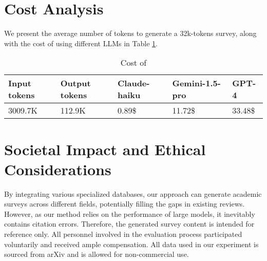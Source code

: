 \section{Cost Analysis}
We present the average number of tokens to generate a 32k-tokens survey, along with the cost of using different LLMs in Table \ref{table:price}. 

\begin{table}[h!]
    \centering
    \caption{Cost of \ourmethod}
    \begin{tabular}{lllll} 
        \toprule
        \textbf{Input tokens} & \textbf{Output tokens}& \textbf{Claude-haiku}&\textbf{Gemini-1.5-pro} & \textbf{GPT-4}\\ 
        \midrule
         3009.7K&112.9K &  0.89\$&11.72\$&33.48\$\\
        \bottomrule
    \end{tabular}
    \label{table:price}
\end{table}

\label{appendix:computational analysis}
\section{Societal Impact and Ethical 
Considerations}
\label{appendix:societal_impact}
By integrating various specialized databases, our approach can generate academic surveys across different fields, potentially filling the gaps in existing reviews. However, as our method relies on the performance of large models, it inevitably contains citation errors. Therefore, the generated survey content is intended for reference only.
All personnel involved in the evaluation process participated voluntarily and received ample compensation. All data used in our experiment is sourced from arXiv and is allowed for non-commercial use.
